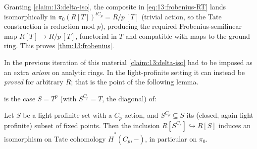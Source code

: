 Granting \cref{claim:13:delta-iso}, the composite in \eqref{eq:13:frobenius-RT}
lands isomorphically in $\pi_0(R[T])^{tC_p}=R/p\,[T]$ (trivial action, so the Tate
construction is reduction mod $p$), producing the required Frobenius-semilinear
map $R[T]\to R/p\,[T]$, functorial in $T$ and compatible with maps to the ground
ring. This proves \cref{thm:13:frobenius}.

\begin{remark}
\label{rmk:13:new-in-light}
In the previous iteration of this material \cref{claim:13:delta-iso} had to be
imposed as an extra \emph{axiom} on analytic rings. In the light-profinite
setting it can instead be \emph{proved} for arbitrary $R$; that is the point of
the following lemma.
\end{remark}

 is the case $S=T^p$ (with $S^{C_p}=T$, the diagonal) of:

\begin{lemma}
\label{lem:13:tate-fixed-points}
Let $S$ be a light profinite set with a $C_p$-action, and $S^{C_p}\subseteq S$
its (closed, again light profinite) subset of fixed points. Then the inclusion
$R[S^{C_p}]\hookrightarrow R[S]$ induces an isomorphism on Tate cohomology
$\widehat H^{*}(C_p,-)$, in particular on $\pi_0$.
\end{lemma}

